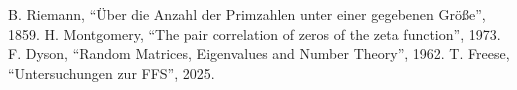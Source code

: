 \documentclass[a4paper,12pt]{article}
\begin{document}
\begin{thebibliography}{9}
 B. Riemann, ``Über die Anzahl der Primzahlen unter einer gegebenen Größe'', 1859.
 H. Montgomery, ``The pair correlation of zeros of the zeta function'', 1973.
 F. Dyson, ``Random Matrices, Eigenvalues and Number Theory'', 1962.
 T. Freese, ``Untersuchungen zur FFS'', 2025.
\end{thebibliography}
\end{document}

